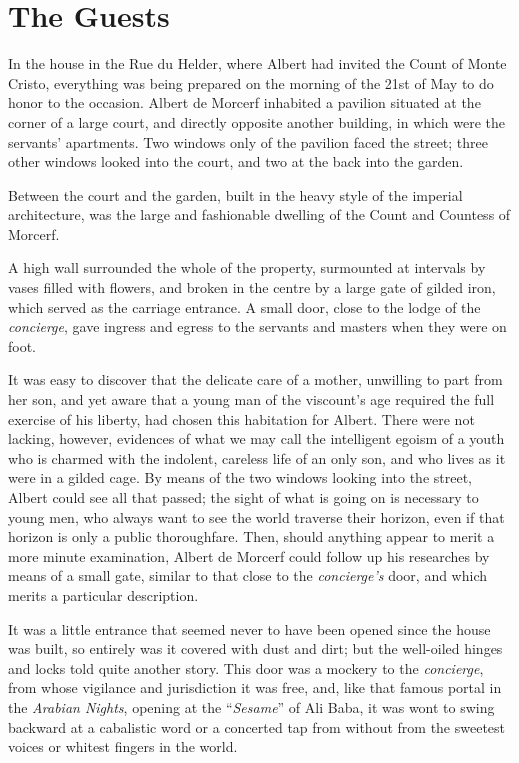 \chapter{The Guests}

In the house in the Rue du Helder, where Albert had invited the Count
of Monte Cristo, everything was being prepared on the morning of the
21st of May to do honor to the occasion. Albert de Morcerf inhabited a
pavilion situated at the corner of a large court, and directly opposite
another building, in which were the servants’ apartments. Two windows
only of the pavilion faced the street; three other windows looked into
the court, and two at the back into the garden.

Between the court and the garden, built in the heavy style of the
imperial architecture, was the large and fashionable dwelling of the
Count and Countess of Morcerf.

A high wall surrounded the whole of the property, surmounted at
intervals by vases filled with flowers, and broken in the centre by a
large gate of gilded iron, which served as the carriage entrance. A
small door, close to the lodge of the \textit{concierge}, gave ingress and
egress to the servants and masters when they were on foot.

It was easy to discover that the delicate care of a mother, unwilling
to part from her son, and yet aware that a young man of the viscount’s
age required the full exercise of his liberty, had chosen this
habitation for Albert. There were not lacking, however, evidences of
what we may call the intelligent egoism of a youth who is charmed with
the indolent, careless life of an only son, and who lives as it were in
a gilded cage. By means of the two windows looking into the street,
Albert could see all that passed; the sight of what is going on is
necessary to young men, who always want to see the world traverse their
horizon, even if that horizon is only a public thoroughfare. Then,
should anything appear to merit a more minute examination, Albert de
Morcerf could follow up his researches by means of a small gate,
similar to that close to the \textit{concierge’s} door, and which merits a
particular description.

It was a little entrance that seemed never to have been opened since
the house was built, so entirely was it covered with dust and dirt; but
the well-oiled hinges and locks told quite another story. This door was
a mockery to the \textit{concierge}, from whose vigilance and jurisdiction it
was free, and, like that famous portal in the \textit{Arabian Nights}, opening
at the “\textit{Sesame}” of Ali Baba, it was wont to swing backward at a
cabalistic word or a concerted tap from without from the sweetest
voices or whitest fingers in the world.

